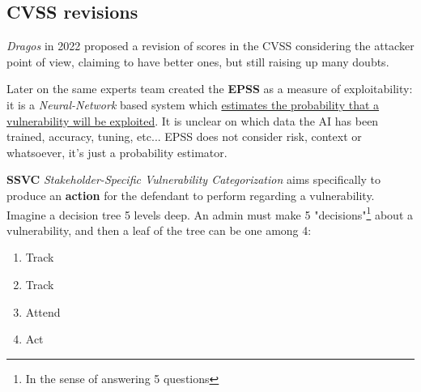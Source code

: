 \subsection{CVSS revisions}
\textit{Dragos} in 2022 proposed a revision of scores in the CVSS considering the attacker point of view, claiming to have better ones,
but still raising up many doubts.

Later on the same experts team created the \textbf{EPSS} as a measure of exploitability:
it is a \textit{Neural-Network} based system which \ul{estimates the probability that a vulnerability will be exploited}.
It is unclear on which data the AI has been trained, accuracy, tuning, etc...
EPSS does not consider risk, context or whatsoever, it's just a probability estimator.

\textbf{SSVC} \textit{Stakeholder-Specific Vulnerability Categorization} aims specifically to produce an \textbf{action} for the defendant to perform regarding a vulnerability. 
Imagine a decision tree 5 levels deep. An admin must make 5 "decisions"\footnote{In the sense of answering 5 questions} about a vulnerability, and then a leaf of the tree can be one among 4:
\begin{enumerate}
    \item {\color{green}Track}
    \item {\color{yellow}Track}
    \item {\color{orange}Attend}
    \item {\color{red}Act}
\end{enumerate}

